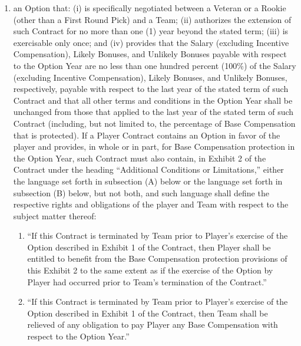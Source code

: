 \documentclass[
]{book}
\providecommand{\tightlist}{%
  \setlength{\itemsep}{0pt}\setlength{\parskip}{0pt}}
\begin{document}
\begin{enumerate}
\def\labelenumi{(\alph{enumi})}
\tightlist
\item
  an Option that: (i) is specifically negotiated between a Veteran or a Rookie (other than a First Round Pick) and a Team; (ii) authorizes the extension of such Contract for no more than one (1) year beyond the stated term; (iii) is exercisable only once; and (iv) provides that the Salary (excluding Incentive Compensation), Likely Bonuses, and Unlikely Bonuses payable with respect to the Option Year are no less than one hundred percent (100\%) of the Salary (excluding Incentive Compensation), Likely Bonuses, and Unlikely Bonuses, respectively, payable with respect to the last year of the stated term of such Contract and that all other terms and conditions in the Option Year shall be unchanged from those that applied to the last year of the stated term of such Contract (including, but not limited to, the percentage of Base Compensation that is protected). If a Player Contract contains an Option in favor of the player and provides, in whole or in part, for Base Compensation protection in the Option Year, such Contract must also contain, in Exhibit 2 of the Contract under the heading ``Additional Conditions or Limitations,'' either the language set forth in subsection (A) below or the language set forth in subsection (B) below, but not both, and such language shall define the respective rights and obligations of the player and Team with respect to the subject matter thereof:

  \begin{enumerate}
  \def\labelenumii{(\Alph{enumii})}
  \tightlist
  \item
    ``If this Contract is terminated by Team prior to Player's exercise of the Option described in Exhibit 1 of the Contract, then Player shall be entitled to benefit from the Base Compensation protection provisions of this Exhibit 2 to the same extent as if the exercise of the Option by Player had occurred prior to Team's termination of the Contract.''
  \item
    ``If this Contract is terminated by Team prior to Player's exercise of the Option described in Exhibit 1 of the Contract, then Team shall be relieved of any obligation to pay Player any Base Compensation with respect to the Option Year.''
  \end{enumerate}


\end{enumerate}
\end{document}
